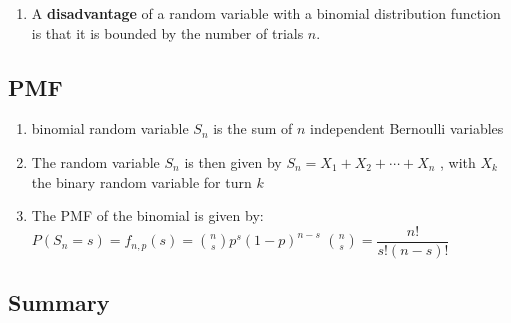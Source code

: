 \begin{enumerate}
    \item A \textbf{disadvantage} of a random variable with a binomial distribution function is that it is bounded by the number of trials $n$.
    \hfill \cite{statistics/book/Statistics-for-Data-Scientists/Maurits-Kaptein}
\end{enumerate}





\subsection{PMF}

\begin{enumerate}
    \item binomial random variable $S_n$ is the sum of $n$ independent Bernoulli variables
    \hfill \cite{statistics/book/Statistics-for-Data-Scientists/Maurits-Kaptein}

    \item The random variable $S_n$ is then given by $S_n = X_1 + X_2 + \cdots + X _n$ , with $X_ k$ the binary random variable for turn $k$
    \hfill \cite{statistics/book/Statistics-for-Data-Scientists/Maurits-Kaptein}

    \item The PMF of the binomial is given by:
    \hfill \cite{statistics/book/Statistics-for-Data-Scientists/Maurits-Kaptein}
    \\
    $
        P(S_n = s)
        = f_{n,p}(s)
        = \displaystyle\binom{n}{s} p^s (1-p)^{n-s}
    $
    \hfill
    $
        \displaystyle\binom{n}{s} = \dfrac{n!}{s!(n-s)!}
    $
    \hfill \cite{statistics/book/Statistics-for-Data-Scientists/Maurits-Kaptein}
\end{enumerate}






\subsection{Summary}

